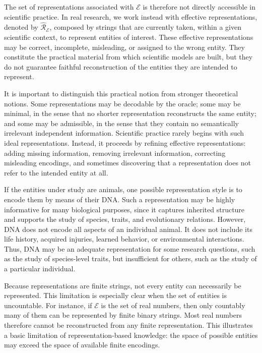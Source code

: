 The set of representations associated with $\mathcal{E}$ is therefore not directly accessible in scientific practice. In real research, we work instead with effective representations, denoted by $\hat{\mathcal{R}}_{\mathcal{E}}$, composed by strings that are currently taken, within a given scientific context, to represent entities of interest. These effective representations may be correct, incomplete, misleading, or assigned to the wrong entity. They constitute the practical material from which scientific models are built, but they do not guarantee faithful reconstruction of the entities they are intended to represent.

It is important to distinguish this practical notion from stronger theoretical notions. Some representations may be decodable by the oracle; some may be minimal, in the sense that no shorter representation reconstructs the same entity; and some may be admissible, in the sense that they contain no semantically irrelevant independent information. Scientific practice rarely begins with such ideal representations. Instead, it proceeds by refining effective representations: adding missing information, removing irrelevant information, correcting misleading encodings, and sometimes discovering that a representation does not refer to the intended entity at all.

\begin{example}
\label{ex:animals_DNA}
If the entities under study are animals, one possible representation style is to encode them by means of their DNA. Such a representation may be highly informative for many biological purposes, since it captures inherited structure and supports the study of species, traits, and evolutionary relations. However, DNA does not encode all aspects of an individual animal. It does not include its life history, acquired injuries, learned behavior, or environmental interactions. Thus, DNA may be an adequate representation for some research questions, such as the study of species-level traits, but insufficient for others, such as the study of a particular individual.
\end{example}

Because representations are finite strings, not every entity can necessarily be represented. This limitation is especially clear when the set of entities is uncountable. For instance, if $\mathcal{E}$ is the set of real numbers, then only countably many of them can be represented by finite binary strings. Most real numbers therefore cannot be reconstructed from any finite representation. This illustrates a basic limitation of representation-based knowledge: the space of possible entities may exceed the space of available finite encodings.

